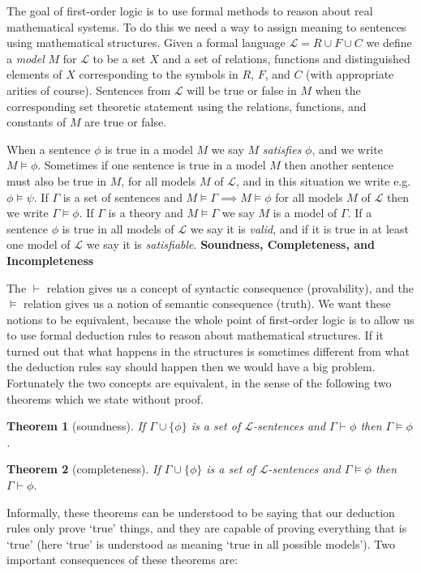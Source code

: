 \documentclass{article}
\theoremstyle{plain}
\newtheorem{theorem}{Theorem}[section]{\bfseries}{\itshape}
\theoremstyle{definition}
\begin{document}
The goal of first-order logic is to use formal methods to reason about real mathematical systems. To do this we need a way to assign meaning to sentences using mathematical structures. Given a formal language $\mathscr{L}=R\cup F\cup C$ we define a \emph{model} $M$ for $\mathscr{L}$ to be a set $X$ and a set of relations, functions and distinguished elements of $X$ corresponding to the symbols in $R$, $F$, and $C$ (with appropriate arities of course). Sentences from $\mathscr{L}$ will be true or false in $M$ when the corresponding set theoretic statement using the relations, functions, and constants of $M$ are true or false.

When a sentence $\phi$ is true in a model $M$ we say $M$ \emph{satisfies} $\phi$, and we write $M\models \phi$. Sometimes if one sentence is true in a model $M$ then another sentence must also be true in $M$, for all models $M$ of $\mathscr{L}$, and in this situation we write e.g. $\phi\models \psi$. If $\Gamma$ is a set of sentences and $M\models\Gamma\implies M\models \phi$ for all models $M$ of $\mathscr{L}$ then we write $\Gamma\models \phi$. If $\Gamma$ is a theory and $M\models \Gamma$ we say $M$ is a model of $\Gamma$. If a sentence $\phi$ is true in all models of $\mathscr{L}$ we say it is \emph{valid}, and if it is true in at least one model of $\mathscr{L}$ we say it is \emph{satisfiable}. 
\newline
\newline
\textbf{Soundness, Completeness, and Incompleteness}

The $\vdash$ relation gives us a concept of syntactic consequence (provability), and the $\models$ relation gives us a notion of semantic consequence (truth). We want these notions to be equivalent, because the whole point of first-order logic is to allow us to use formal deduction rules to reason about mathematical structures. If it turned out that what happens in the structures is sometimes different from what the deduction rules say should happen then we would have a big problem. Fortunately the two concepts are equivalent, in the sense of the following two theorems which we state without proof.
\begin{theorem}[soundness]
If $\Gamma\cup\{\phi\}$ is a set of $\mathscr{L}$-sentences and $\Gamma\vdash \phi$ then $\Gamma\models \phi$.
\end{theorem}

\begin{theorem}[completeness]
If $\Gamma\cup\{\phi\}$ is a set of $\mathscr{L}$-sentences and $\Gamma\models \phi$ then $\Gamma\vdash \phi$.
\end{theorem}
Informally, these theorems can be understood to be saying that our deduction rules only prove `true' things, and they are capable of proving everything that is `true' (here `true' is understood as meaning `true in all possible models'). Two important consequences of these theorems are:
\end{document}
